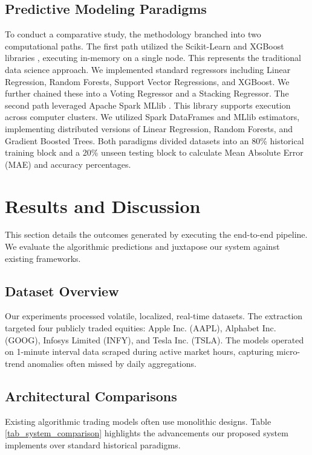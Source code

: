\documentclass[conference]{IEEEtran}
\begin{document}
\subsection{Predictive Modeling Paradigms}
To conduct a comparative study, the methodology branched into two computational paths.
The first path utilized the Scikit-Learn \cite{ref18} and XGBoost libraries \cite{ref16}, executing in-memory on a single node. This represents the traditional data science approach. We implemented standard regressors including Linear Regression, Random Forests, Support Vector Regressions, and XGBoost. We further chained these into a Voting Regressor and a Stacking Regressor.
The second path leveraged Apache Spark MLlib \cite{ref19}. This library supports execution across computer clusters. We utilized Spark DataFrames and MLlib estimators, implementing distributed versions of Linear Regression, Random Forests, and Gradient Boosted Trees. Both paradigms divided datasets into an 80\% historical training block and a 20\% unseen testing block to calculate Mean Absolute Error (MAE) and accuracy percentages.

\section{Results and Discussion}
This section details the outcomes generated by executing the end-to-end pipeline. We evaluate the algorithmic predictions and juxtapose our system against existing frameworks.

\subsection{Dataset Overview}
Our experiments processed volatile, localized, real-time datasets. The extraction targeted four publicly traded equities: Apple Inc. (AAPL), Alphabet Inc. (GOOG), Infosys Limited (INFY), and Tesla Inc. (TSLA). The models operated on 1-minute interval data scraped during active market hours, capturing micro-trend anomalies often missed by daily aggregations.

\subsection{Architectural Comparisons}
Existing algorithmic trading models often use monolithic designs. Table \ref{tab_system_comparison} highlights the advancements our proposed system implements over standard historical paradigms.
\end{document}
